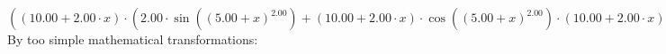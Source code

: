 \documentclass{article}
\begin{document}
$({\left({{10.00} + {{2.00} \cdot {x}}}\right) \cdot \left({{{2.00} \cdot  \sin {\left({\left({{5.00} + {x}}\right) ^ {2.00}}\right)} } + {\left({{10.00} + {{2.00} \cdot {x}}}\right) \cdot { \cos {\left({\left({{5.00} + {x}}\right) ^ {2.00}}\right)}  \cdot \left({{10.00} + {{2.00} \cdot {x}}}\right)}}}\right)})'(x) = {{{{4.00} \cdot  \sin {\left({\left({{5.00} + {x}}\right) ^ {2.00}}\right)} } + {{2.00} \cdot {\left({{10.00} + {{2.00} \cdot {x}}}\right) \cdot { \cos {\left({\left({{5.00} + {x}}\right) ^ {2.00}}\right)}  \cdot \left({{10.00} + {{2.00} \cdot {x}}}\right)}}}} + {\left({{10.00} + {{2.00} \cdot {x}}}\right) \cdot \left({{{2.00} \cdot { \cos {\left({\left({{5.00} + {x}}\right) ^ {2.00}}\right)}  \cdot \left({{10.00} + {{2.00} \cdot {x}}}\right)}} + {{{2.00} \cdot { \cos {\left({\left({{5.00} + {x}}\right) ^ {2.00}}\right)}  \cdot \left({{10.00} + {{2.00} \cdot {x}}}\right)}} + {\left({{10.00} + {{2.00} \cdot {x}}}\right) \cdot \left({{\left({-1.00}\right) \cdot {\left({{10.00} + {{2.00} \cdot {x}}}\right) \cdot {\left({{10.00} + {{2.00} \cdot {x}}}\right) \cdot  \sin {\left({\left({{5.00} + {x}}\right) ^ {2.00}}\right)} }}} + {{2.00} \cdot  \cos {\left({\left({{5.00} + {x}}\right) ^ {2.00}}\right)} }}\right)}}}\right)}}$\newline
\newline
By too simple mathematical transformations:
\end{document}
